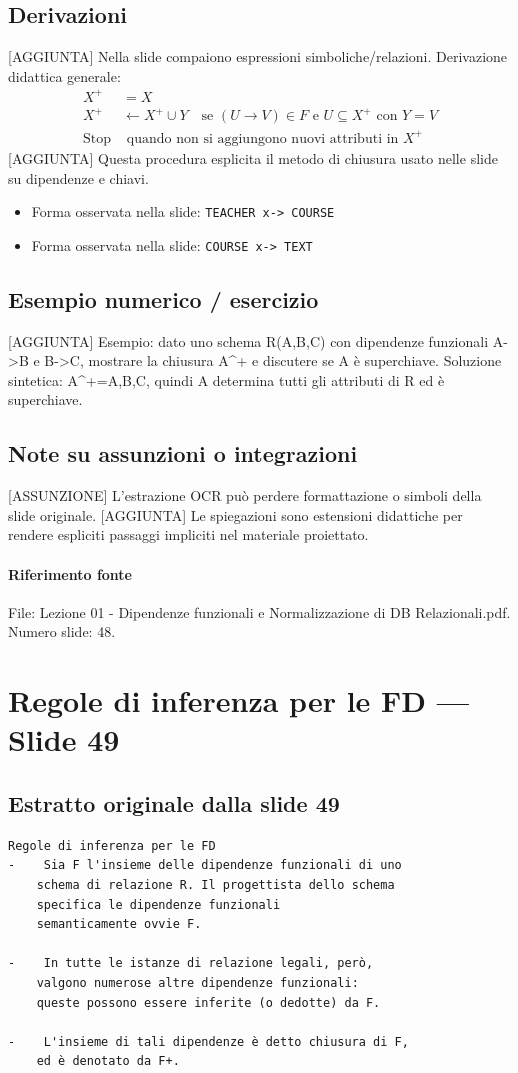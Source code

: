 \documentclass[11pt]{article}
\begin{document}
\subsection*{Derivazioni}
[AGGIUNTA] Nella slide compaiono espressioni simboliche/relazioni. Derivazione didattica generale:
\begin{align*}
X^+ &= X \\
X^+ &\leftarrow X^+ \cup Y \quad \text{se } (U \to V) \in F \text{ e } U \subseteq X^+ \text{ con } Y=V \\
\text{Stop} &\text{ quando non si aggiungono nuovi attributi in } X^+
\end{align*}
[AGGIUNTA] Questa procedura esplicita il metodo di chiusura usato nelle slide su dipendenze e chiavi.
\begin{itemize}[leftmargin=*]
\item Forma osservata nella slide: \texttt{TEACHER x-> COURSE}
\item Forma osservata nella slide: \texttt{COURSE x-> TEXT}
\end{itemize}
\subsection*{Esempio numerico / esercizio}
[AGGIUNTA] Esempio: dato uno schema R(A,B,C) con dipendenze funzionali A->B e B->C, mostrare la chiusura A^+ e discutere se A è superchiave. Soluzione sintetica: A^+={A,B,C}, quindi A determina tutti gli attributi di R ed è superchiave.
\subsection*{Note su assunzioni o integrazioni}
[ASSUNZIONE] L'estrazione OCR può perdere formattazione o simboli della slide originale.
[AGGIUNTA] Le spiegazioni sono estensioni didattiche per rendere espliciti passaggi impliciti nel materiale proiettato.
\paragraph{Riferimento fonte} File: Lezione 01 - Dipendenze funzionali e Normalizzazione di DB Relazionali.pdf. Numero slide: 48.
\section{Regole di inferenza per le FD --- Slide 49}
\subsection*{Estratto originale dalla slide 49}
\begin{lstlisting}
Regole di inferenza per le FD
-    Sia F l'insieme delle dipendenze funzionali di uno
    schema di relazione R. Il progettista dello schema
    specifica le dipendenze funzionali
    semanticamente ovvie F.

-    In tutte le istanze di relazione legali, però,
    valgono numerose altre dipendenze funzionali:
    queste possono essere inferite (o dedotte) da F.

-    L'insieme di tali dipendenze è detto chiusura di F,
    ed è denotato da F+.
\end{lstlisting}
\end{document}

